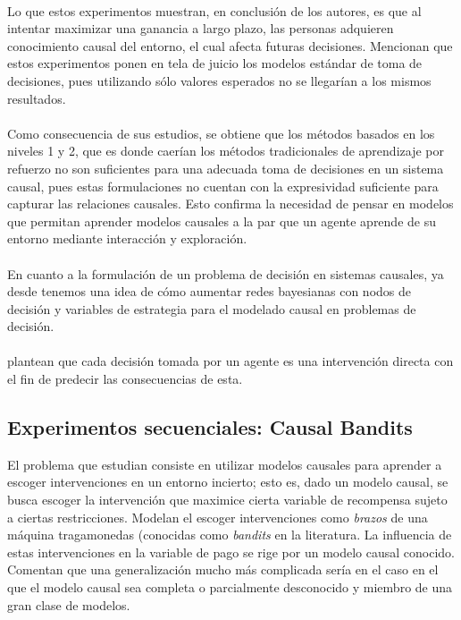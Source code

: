 \documentclass[11pt]{article}
\theoremstyle{plain}
\begin{document}
\\
Lo que estos experimentos muestran, en conclusión de los autores, es que al intentar maximizar una ganancia a largo plazo, las personas adquieren conocimiento causal del entorno, el cual afecta futuras decisiones. Mencionan que estos experimentos ponen en tela de juicio los modelos estándar de toma de decisiones, pues utilizando sólo valores esperados no se llegarían a los mismos resultados.\\
\\
Como consecuencia de sus estudios, se obtiene que los métodos basados en los niveles 1 y 2, que es donde caerían los métodos tradicionales de aprendizaje por refuerzo no son suficientes para una adecuada toma de decisiones en un sistema causal, pues estas formulaciones no cuentan con la expresividad suficiente para capturar las relaciones causales. Esto confirma la necesidad de pensar en modelos que permitan aprender modelos causales a la par que un agente aprende de su entorno mediante interacción y exploración.\\
\\
En cuanto a la formulación de un problema de decisión en sistemas causales, ya desde \cite{dawid2002influence} tenemos una idea de cómo aumentar redes bayesianas con nodos de decisión y variables de estrategia para el modelado causal en problemas de decisión.\\
\\
\cite{hagmayer2009decision} plantean que cada decisión tomada por un agente es una intervención directa con el fin de predecir las consecuencias de esta. 

\subsection{Experimentos secuenciales: Causal Bandits}
El problema que \cite{lattimoreNIPS2016} estudian consiste en utilizar modelos causales para aprender a escoger intervenciones en un entorno incierto; esto es, dado un modelo causal, se busca escoger la intervención que maximice cierta variable de recompensa sujeto a ciertas restricciones. Modelan el escoger intervenciones como \textit{brazos} de una máquina tragamonedas (conocidas como \textit{bandits} en la literatura. La influencia de estas intervenciones en la variable de pago se rige por un modelo causal conocido. Comentan que una generalización mucho más complicada sería en el caso en el que el modelo causal sea completa o parcialmente desconocido y miembro de una gran clase de modelos.
\end{document}
